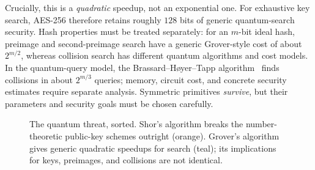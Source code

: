 Crucially, this is a \emph{quadratic} speedup, not an exponential one. For exhaustive key search, AES-256 therefore retains roughly $128$ bits of generic quantum-search security. Hash properties must be treated separately: for an $m$-bit ideal hash, preimage and second-preimage search have a generic Grover-style cost of about $2^{m/2}$, whereas collision search has different quantum algorithms and cost models. In the quantum-query model, the Brassard--H\o yer--Tapp algorithm~\cite{bht1997} finds collisions in about $2^{m/3}$ queries; memory, circuit cost, and concrete security estimates require separate analysis. Symmetric primitives \emph{survive}, but their parameters and security goals must be chosen carefully.

\begin{figure}[H]
\centering
{}
\caption{The quantum threat, sorted. Shor's algorithm breaks the number-theoretic public-key schemes outright (orange). Grover's algorithm gives generic quadratic speedups for search (teal); its implications for keys, preimages, and collisions are not identical.}
\label{fig:quantum-threat}
\end{figure}

